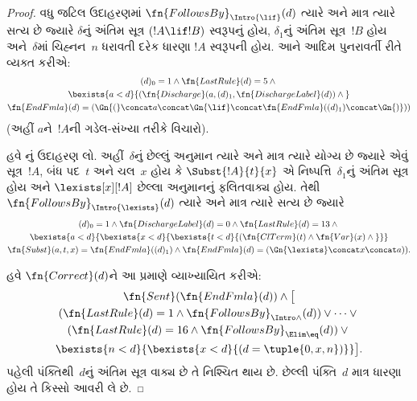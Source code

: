 \begin{proof}
  વધુ જટિલ ઉદાહરણમાં
  $\fn{FollowsBy}_{\Intro{\lif}}(d)$
  ત્યારે અને માત્ર ત્યારે સત્ય છે જ્યારે
  $\delta$નું અંતિમ સૂત્ર
  $(!A \lif !B)$ સ્વરૂપનું હોય,
  $\delta_1$નું અંતિમ સૂત્ર~$!B$
  હોય અને~$\delta$માં ચિહ્નન~$n$
  ધરાવતી દરેક ધારણા $!A$ સ્વરૂપની હોય.
  આને આદિમ પુનરાવર્તી રીતે વ્યક્ત કરીએ:
  \begin{multline*}
    (d)_0 = 1 \land \fn{LastRule}(d) = 5 \land {}\\
    \bexists{a<d}{(\fn{Discharge}(a, (d)_1, \fn{DischargeLabel}(d)) \land {}}\\
      \fn{EndFmla}(d) = (\Gn{(} \concat a \concat \Gn{\lif}
      \concat \fn{EndFmla}((d)_1) \concat \Gn{)}))
  \end{multline*}
  (અહીં $a$ને~$!A$ની ગડેલ-સંખ્યા
  તરીકે વિચારો).

  હવે \Intro{\lexists}નું ઉદાહરણ લો.
  અહીં~$\delta$નું છેલ્લું અનુમાન
  ત્યારે અને માત્ર ત્યારે યોગ્ય છે
  જ્યારે એવું સૂત્ર~$!A$,
  બંધ પદ~$t$ અને ચલ~$x$
  હોય કે $\Subst{!A}{t}{x}$ એ
  નિષ્પત્તિ~$\delta_1$નું અંતિમ
  સૂત્ર હોય અને
  $\lexists[x][!A]$ છેલ્લા અનુમાનનું
  ફલિતવાક્ય હોય. તેથી
  $\fn{FollowsBy}_{\Intro{\lexists}}(d)$
  ત્યારે અને માત્ર ત્યારે સત્ય છે જ્યારે
  \begin{multline*}
    (d)_0 = 1 \land \fn{DischargeLabel}(d) = 0 \land
    \fn{LastRule}(d) = 13 \land {} \\
    \bexists{a < d}{\bexists{x<d}{\bexists{t<d}{
          (\fn{ClTerm}(t) \land \fn{Var}(x)  \land {}}}}\\
    \fn{Subst}(a,t,x) = \fn{EndFmla}((d)_1) \land
    \fn{EndFmla}(d) = (\Gn{\lexists} \concat x \concat a)).
  \end{multline*}

  હવે $\fn{Correct}(d)$ને આ પ્રમાણે
  વ્યાખ્યાયિત કરીએ:
  \begin{multline*}
    \fn{Sent}(\fn{EndFmla}(d)) \land \bigl[{}\\
    (\fn{LastRule}(d) = 1 \land
    \fn{FollowsBy}_{\Intro\land}(d)) \lor \dots \lor {}\\
    (\fn{LastRule}(d) = 16 \land \fn{FollowsBy}_{\Elim\eq}(d)) \lor {}\\
    \bexists{n<d}{\bexists{x<d}{(d = \tuple{0, x, n})}}\bigr].
  \end{multline*}
  પહેલી પંક્તિથી~$d$નું અંતિમ
  સૂત્ર વાક્ય છે તે નિશ્ચિત
  થાય છે. છેલ્લી પંક્તિ~$d$
  માત્ર ધારણા હોય તે કિસ્સો આવરી લે છે.
\end{proof}

